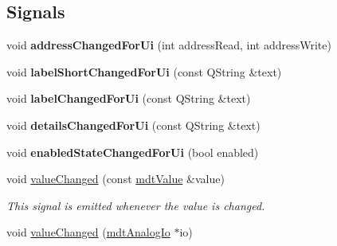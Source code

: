 \subsection*{Signals}
\begin{DoxyCompactItemize}
\item 
\hypertarget{classmdt_abstract_io_ab7021086e4d4ded1e4487a2e60383d0e}{
void {\bfseries addressChangedForUi} (int addressRead, int addressWrite)}
\label{classmdt_abstract_io_ab7021086e4d4ded1e4487a2e60383d0e}

\item 
\hypertarget{classmdt_abstract_io_aa12930a4316d7679668a07855c92e625}{
void {\bfseries labelShortChangedForUi} (const QString \&text)}
\label{classmdt_abstract_io_aa12930a4316d7679668a07855c92e625}

\item 
\hypertarget{classmdt_abstract_io_ab87859883a00193ac680c09cfef8dc84}{
void {\bfseries labelChangedForUi} (const QString \&text)}
\label{classmdt_abstract_io_ab87859883a00193ac680c09cfef8dc84}

\item 
\hypertarget{classmdt_abstract_io_aa6add53c265560420b70852ba490c2ff}{
void {\bfseries detailsChangedForUi} (const QString \&text)}
\label{classmdt_abstract_io_aa6add53c265560420b70852ba490c2ff}

\item 
\hypertarget{classmdt_abstract_io_a4406bc16e8decdb506b34d9ca679203e}{
void {\bfseries enabledStateChangedForUi} (bool enabled)}
\label{classmdt_abstract_io_a4406bc16e8decdb506b34d9ca679203e}

\item 
\hypertarget{classmdt_abstract_io_a43feaa62996af78f64aea084122f1370}{
void \hyperlink{classmdt_abstract_io_a43feaa62996af78f64aea084122f1370}{valueChanged} (const \hyperlink{classmdt_value}{mdtValue} \&value)}
\label{classmdt_abstract_io_a43feaa62996af78f64aea084122f1370}

\begin{DoxyCompactList}\small\item\em This signal is emitted whenever the value is changed. \end{DoxyCompactList}\item 
\hypertarget{classmdt_abstract_io_a741fe409fdbe68002fdca3e7f7fdbac1}{
void \hyperlink{classmdt_abstract_io_a741fe409fdbe68002fdca3e7f7fdbac1}{valueChanged} (\hyperlink{classmdt_analog_io}{mdtAnalogIo} $\ast$io)}
\label{classmdt_abstract_io_a741fe409fdbe68002fdca3e7f7fdbac1}


\end{DoxyCompactItemize}
